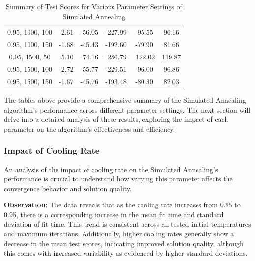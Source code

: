 \documentclass[
]{article}
\begin{document}
\begin{table}[H]
{\begin{tabular}{|c|c|c|c|c|c|}
                0.95, 1000, 100            & -2.61                      & -56.05                     & -227.99                    & -95.55                   & 96.16                   \\
                0.95, 1000, 150            & -1.68                      & -45.43                     & -192.60                    & -79.90                   & 81.66                   \\
                0.95, 1500, 50             & -5.10                      & -74.16                     & -286.79                    & -122.02                  & 119.87                  \\
                0.95, 1500, 100            & -2.72                      & -55.77                     & -229.51                    & -96.00                   & 96.86                   \\
                0.95, 1500, 150            & -1.67                      & -45.76                     & -193.48                    & -80.30                   & 82.03                   \\
                \hline
            \end{tabular}
        }
        \caption{Summary of Test Scores for Various Parameter Settings of Simulated Annealing}
        \label{tab:sa_summary_test_scores}
    \end{table}

    The tables above provide a comprehensive summary of the Simulated Annealing algorithm's performance across different parameter settings. The next section will delve into a detailed analysis of these results, exploring the impact of each parameter on the algorithm's effectiveness and efficiency.

    \subsubsection{Impact of Cooling Rate}

    An analysis of the impact of cooling rate on the Simulated Annealing’s performance is crucial to understand how varying this parameter affects the convergence behavior and solution quality.

    \textbf{Observation}: The data reveals that as the cooling rate increases from 0.85 to 0.95, there is a corresponding increase in the mean fit time and standard deviation of fit time. This trend is consistent across all tested initial temperatures and maximum iterations. Additionally, higher cooling rates generally show a decrease in the mean test scores, indicating improved solution quality, although this comes with increased variability as evidenced by higher standard deviations.
\end{document}
